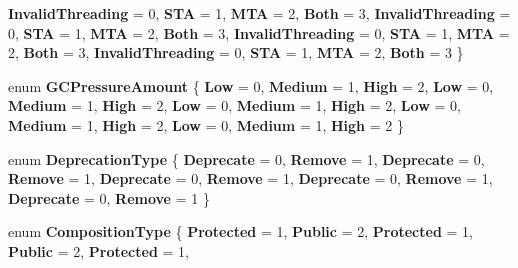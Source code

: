 \begin{DoxyCompactItemize}
{\bfseries Invalid\+Threading} = 0, 
{\bfseries S\+TA} = 1, 
{\bfseries M\+TA} = 2, 
{\bfseries Both} = 3, 
\newline
{\bfseries Invalid\+Threading} = 0, 
{\bfseries S\+TA} = 1, 
{\bfseries M\+TA} = 2, 
{\bfseries Both} = 3, 
\newline
{\bfseries Invalid\+Threading} = 0, 
{\bfseries S\+TA} = 1, 
{\bfseries M\+TA} = 2, 
{\bfseries Both} = 3, 
\newline
{\bfseries Invalid\+Threading} = 0, 
{\bfseries S\+TA} = 1, 
{\bfseries M\+TA} = 2, 
{\bfseries Both} = 3
 \}
\item 
\mbox{\label{namespace_windows_1_1_foundation_1_1_metadata_a877de1cc5a89f9df6ace56ccf9883aa4}} 
enum {\bfseries G\+C\+Pressure\+Amount} \{ \newline
{\bfseries Low} = 0, 
{\bfseries Medium} = 1, 
{\bfseries High} = 2, 
{\bfseries Low} = 0, 
\newline
{\bfseries Medium} = 1, 
{\bfseries High} = 2, 
{\bfseries Low} = 0, 
{\bfseries Medium} = 1, 
\newline
{\bfseries High} = 2, 
{\bfseries Low} = 0, 
{\bfseries Medium} = 1, 
{\bfseries High} = 2, 
\newline
{\bfseries Low} = 0, 
{\bfseries Medium} = 1, 
{\bfseries High} = 2
 \}
\item 
\mbox{\label{namespace_windows_1_1_foundation_1_1_metadata_a6012664166c4aca6e08f2f623e42d611}} 
enum {\bfseries Deprecation\+Type} \{ \newline
{\bfseries Deprecate} = 0, 
{\bfseries Remove} = 1, 
{\bfseries Deprecate} = 0, 
{\bfseries Remove} = 1, 
\newline
{\bfseries Deprecate} = 0, 
{\bfseries Remove} = 1, 
{\bfseries Deprecate} = 0, 
{\bfseries Remove} = 1, 
\newline
{\bfseries Deprecate} = 0, 
{\bfseries Remove} = 1
 \}
\item 
\mbox{\label{namespace_windows_1_1_foundation_1_1_metadata_a505a6f2bc4b2b9794234c3c04a49dab7}} 
enum {\bfseries Composition\+Type} \{ \newline
{\bfseries Protected} = 1, 
{\bfseries Public} = 2, 
{\bfseries Protected} = 1, 
{\bfseries Public} = 2, 
\newline
{\bfseries Protected} = 1, 

\end{DoxyCompactItemize}
